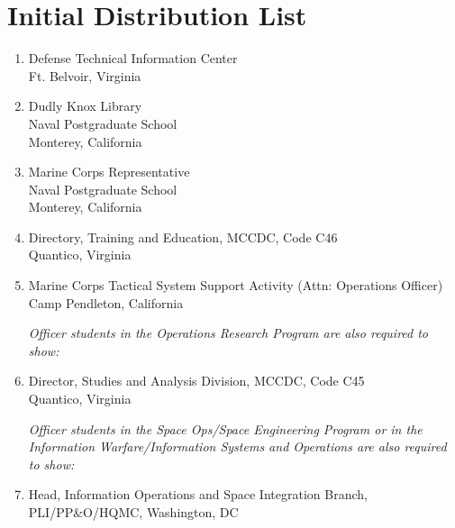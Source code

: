\documentclass[twoside,thesis,authorindex,index]{npsreport}
\begin{document}
\chapter*{Initial Distribution List}
\singlespace
\begin{enumerate}
\item Defense Technical Information Center\\Ft. Belvoir, Virginia
\item Dudly Knox Library\\Naval Postgraduate School\\Monterey, California
\item Marine Corps Representative\\Naval Postgraduate School\\Monterey, California
\item Directory, Training and Education, MCCDC, Code C46\\Quantico, Virginia
\item Marine Corps Tactical System Support Activity (Attn: Operations
  Officer)\\Camp Pendleton, California

\textit{Officer students in the Operations Research Program are also required
to show:}

\item Director, Studies and Analysis Division, MCCDC, Code C45\\
Quantico, Virginia

\textit{Officer students in the Space Ops/Space Engineering Program or in the
Information Warfare/Information Systems and Operations are also
required to show:}

\item Head, Information Operations and Space Integration Branch,\\
PLI/PP\&O/HQMC, Washington, DC

\end{enumerate}
\end{document}
